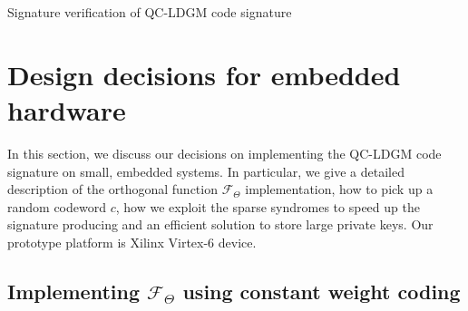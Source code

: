 \documentclass[10pt,journal,compsoc]{IEEEtran}
\begin{document}
\begin{algorithm}[h]	
	\DontPrintSemicolon %
	\caption{Signature verification of QC-LDGM code signature}\label{alg:sigverify}
\end{algorithm}


\section{Design decisions for embedded hardware}
In this section, we discuss our decisions on implementing the QC-LDGM code signature on small, embedded systems. In particular, we give a detailed description of the orthogonal function $\mathcal{F}_\Theta$ implementation, how to pick up
a random codeword $c$, how we exploit the sparse syndromes to speed up the signature producing and an efficient solution to store large private keys.  Our prototype platform is Xilinx Virtex-6 device.


\subsection{Implementing $\mathcal{F}_\Theta$ using constant weight coding}
\end{document}
